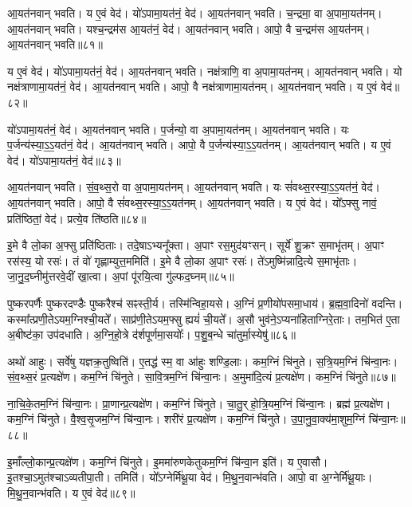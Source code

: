 आ॒यत॑नवान्‌ भवति। य ए॒वं वेद॑। 
यो॑ऽपामा॒यत॑नं॒ वेद॑। आ॒यत॑नवान्‌ भवति। 
च॒न्द्रमा॒ वा अ॒पामा॒यत॑नम्। आ॒यत॑नवान्‌ भवति। 
यश्च॒न्द्रम॑स आ॒यत॑नं॒ वेद॑। आ॒यत॑नवान्‌ भवति। 
आपो॒ वै च॒न्द्रम॑स आ॒यत॑नम्। आ॒यत॑नवान्‌ भवति॥८१॥


य ए॒वं वेद॑। यो॑ऽपामा॒यत॑नं॒ वेद॑। 
आ॒यत॑नवान्‌ भवति। नक्ष॑त्राणि॒ वा अ॒पामा॒यत॑नम्। 
आ॒यत॑नवान्‌ भवति। यो नक्ष॑त्राणामा॒यत॑नं॒ वेद॑। 
आ॒यत॑नवान्‌ भवति। आपो॒ वै नक्ष॑त्राणामा॒यत॑नम्। 
आ॒यत॑नवान्‌ भवति। य ए॒वं वेद॑॥८२॥


यो॑ऽपामा॒यत॑नं॒ वेद॑। आ॒यत॑नवान्‌ भवति।
प॒र्जन्यो॒ वा अ॒पामा॒यत॑नम्। आ॒यत॑नवान्‌ भवति। 
यः प॒र्जन्य॑स्या॒ऽ॒ऽ॒यत॑नं॒ वेद॑। आ॒यत॑नवान्‌ भवति। 
आपो॒ वै प॒र्जन्य॑स्या॒ऽ॒ऽ॒यत॑नम्। आ॒यत॑नवान्‌ भवति। 
य ए॒वं वेद॑। यो॑ऽपामा॒यत॑नं॒ वेद॑॥८३॥


आ॒यत॑नवान्‌ भवति। सं॒व॒थ्स॒रो वा अ॒पामा॒यत॑नम्। 
आ॒यत॑नवान्‌ भवति। यः सं॑वथ्स॒रस्या॒ऽ॒ऽ॒यत॑नं॒ वेद॑। 
आ॒यत॑नवान्‌ भवति। आपो॒ वै सं॑वथ्स॒रस्या॒ऽ॒ऽ॒यत॑नम्। 
आ॒यत॑नवान्‌ भवति। य ए॒वं वेद॑। 
यो᳚ऽफ्सु नावं॒ प्रति॑ष्ठितां॒ वेद॑। प्रत्ये॒व ति॑ष्ठति॥८४॥


इ॒मे वै लो॒का अ॒फ्सु प्रति॑ष्ठिताः। तदे॒षाऽभ्यनू᳚क्ता। 
अ॒पाꣳ रस॒मुद॑यꣳसन्। सूर्ये॑ शु॒क्रꣳ स॒माभृ॑तम्। 
अ॒पाꣳ रस॑स्य॒ यो रसः॑। तं वो॑ गृह्णाम्युत्त॒ममिति॑। 
इ॒मे वै लो॒का अ॒पाꣳ रसः॑। ते॑ऽमुष्मि॑न्नादि॒त्ये स॒माभृ॑ताः। 
जा॒नु॒द॒घ्नीमु॑त्तर\-वे॒दीं खा॒त्वा। अ॒पां पू॑रयि॒त्वा गु॑ल्फद॒घ्नम्॥८५॥


पुष्करपर्णैः पुष्करदण्डैः पुष्करैश्च॑ सꣴस्ती॒र्य। तस्मि॑न्वि\-हा॒यसे। 
अ॒ग्निं प्र॒णीयो॑पसमा॒धाय॑। ब्र॒ह्म॒वा॒दिनो॑ वदन्ति। 
कस्मा᳚त्प्रणी॒ते\-ऽयम॒ग्निश्ची॒यते᳚। साप्र॑णी॒तेऽयम॒फ्सु ह्ययं॑ ची॒यते᳚। 
अ॒सौ भुव॑ने॒ऽप्यना॑हिताग्निरे॒ताः। तम॒भित॑ ए॒ता अ॒बीष्ट॑का॒ उप॑दधाति। 
अ॒ग्नि॒हो॒त्रे द॑र्शपूर्णमा॒सयोः᳚। प॒शु॒ब॒न्धे चा॑तुर्मा॒स्येषु॑॥८६॥


अथो॑ आहुः। सर्वे॑षु यज्ञक्र॒तुष्विति॑। 
ए॒तद्ध॑ स्म॒ वा आ॑हुः शण्डि॒लाः। कम॒ग्निं चि॑नुते। 
स॒त्रि॒यम॒ग्निं चि॑न्वा॒नः। सं॒व॒थ्स॒रं प्र॒त्यक्षे॑ण। 
कम॒ग्निं चि॑नुते। सा॒वि॒त्रम॒ग्निं चि॑न्वा॒नः। 
अ॒मुमा॑दि॒त्यं प्र॒त्यक्षे॑ण। कम॒ग्निं चि॑नुते॥८७॥


ना॒चि॒के॒तम॒ग्निं चि॑न्वा॒नः। 
प्रा॒णान्प्र॒त्यक्षे॑ण। कम॒ग्निं चि॑नुते। चा॒तु॒र्‌हो॒त्रि॒य\-म॒ग्निं चि॑न्वा॒नः। 
ब्रह्म॑ प्र॒त्यक्षे॑ण। कम॒ग्निं चि॑नुते। वै॒श्व॒सृ॒जम॒ग्निं चि॑न्वा॒नः। 
शरी॑रं प्र॒त्यक्षे॑ण। कम॒ग्निं चि॑नुते। उ॒पा॒नु॒वा॒क्य॑\-मा॒शुम॒ग्निं चि॑न्वा॒नः॥८८॥


इ॒माँल्लो॒कान्प्र॒त्यक्षे॑ण। कम॒ग्निं चि॑नुते। 
इ॒ममा॑रुणकेतुकम॒ग्निं चि॑न्वा॒न इति॑। य ए॒वासौ। 
इ॒तश्चा॒ऽमुत॑श्चाऽव्यतीपा॒ती। तमिति॑। 
यो᳚ऽग्नेर्मि॑थू॒या वेद॑। मि॒थु॒न॒वान्भ॑वति। 
आपो॒ वा अ॒ग्नेर्मि॑थू॒याः। मि॒थु॒न॒वान्भ॑वति। य ए॒वं वेद॑॥८९॥\anuvakamend


